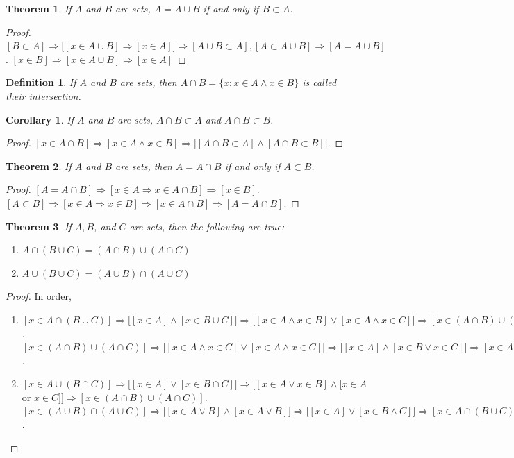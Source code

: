 \documentclass[12pt,oneside]{book}
\theoremstyle{mystyle}
\newtheorem{theorem}{Theorem}[section]
\newtheorem{definition}{Definition}[section]
\newtheorem{corollary}{Corollary}[section]
\begin{document}
\begin{theorem}
If $A$ and $B$ are sets, $A=A\cup B$ if and only if $B\subset A$.
\end{theorem}
\begin{proof}
$[B\subset A]\Rightarrow \big[[x\in A\cup B] \Rightarrow [x\in A]\big]\Rightarrow[A\cup B \subset A], [A\subset A\cup B]\Rightarrow[A=A\cup B]$. $[x\in B] \Rightarrow [x\in A\cup B]\Rightarrow [x\in A]$
\end{proof}

\begin{definition}
If $A$ and $B$ are sets, then $A\cap B = \{x:x\in A \land x\in B\}$ is called their intersection.
\end{definition}

\begin{corollary}
If $A$ and $B$ are sets, $A\cap B \subset A$ and $A\cap B \subset B$.
\end{corollary}
\begin{proof}
$[x\in A\cap B]\Rightarrow [x\in A\land x\in B]\Rightarrow \big[[A\cap B \subset A]\land [A\cap B \subset B]\big]$.
\end{proof}

\begin{theorem}
If $A$ and $B$ are sets, then $A=A\cap B$ if and only if $A\subset B$.
\end{theorem}
\begin{proof}
$[A=A\cap B]\Rightarrow [x\in A\Rightarrow x\in A \cap B]\Rightarrow [x\in B]$. $[A\subset B]\Rightarrow [x\in A\Rightarrow x\in B]\Rightarrow [x\in A\cap B]\Rightarrow [A=A\cap B]$.
\end{proof}

\begin{theorem}
If $A,B$, and $C$ are sets, then the following are true:
\begin{enumerate}
\item $A\cap (B\cup C) = (A\cap B)\cup (A\cap C)$
\item $A\cup (B\cup C) = (A\cup B)\cap (A\cup C)$
\end{enumerate}
\end{theorem}
\begin{proof}
In order,
\begin{enumerate}
\item $[x\in A\cap (B\cup C)]\Rightarrow \big[[x\in A] \land [x\in B\cup C]\big]\Rightarrow \big[[x\in A\land x\in B]\lor [x\in A\land x\in C]\big]\Rightarrow [x\in (A\cap B)\cup (A\cap C)]$. $[x\in (A\cap B)\cup(A\cap C)]\Rightarrow \big[[x\in A\land x\in C]\lor [x\in A \land x\in C]\big]\Rightarrow \big[[x\in A]\land [x\in B\lor x\in C]\big]\Rightarrow [x\in A\cap(B\cup C)]$.
\item $[x\in A\cup (B\cap C)]\Rightarrow \big[[x\in A]\lor [x\in B\cap C]\big] \Rightarrow \big[[x\in A \lor x\in B]\land [x\in A$ or $x\in C]\big]\Rightarrow [x\in (A\cap B)\cup (A\cap C)]$. $[x\in (A\cup B)\cap (A\cup C)]\Rightarrow \big[[x\in A\lor B]\land [x\in A\lor B]\big]\Rightarrow \big[[x\in A]\lor[x\in B\land C]\big]\Rightarrow [x\in A\cap(B\cup C)]$.
\end{enumerate}
\end{proof}
\end{document}
